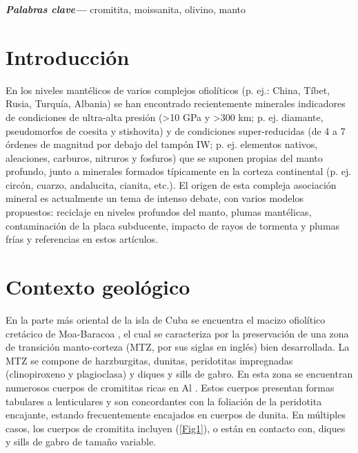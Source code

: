 \documentclass[a4paper,11pt]{article}
\providecommand{\keywords}[1]{\textbf{\textit{Palabras clave---}} #1}
\begin{document}
	\keywords{cromitita, moissanita, olivino, manto}
	 \\
	 \tableofcontents
	\begin{multicols}{2}
		\section{Introducción}
		En los niveles mantélicos de varios complejos ofiolíticos (p. ej.: China, Tíbet, Rusia, Turquía, Albania) se han encontrado recientemente minerales indicadores de condiciones de ultra-alta presión (\textgreater10 GPa y \textgreater300 km; p. ej. diamante, pseudomorfos de coesita y stishovita) y de condiciones super-reducidas (de 4 a 7 órdenes de magnitud por debajo del tampón IW; p. ej. elementos nativos, aleaciones, carburos, nitruros y fosfuros) que se suponen propias del manto profundo, junto a minerales formados típicamente en la corteza continental (p. ej. circón, cuarzo, andalucita, cianita, etc.). El origen de esta compleja asociación mineral es actualmente un tema de intenso debate, con varios modelos propuestos: reciclaje en niveles profundos del manto, plumas mantélicas, contaminación de la placa subducente, impacto de rayos de tormenta y plumas frías \cite{Pujol-Sola2018,Xiong} y referencias en estos artículos. 
		\section{Contexto geológico}
		En la parte más oriental de la isla de Cuba se encuentra el macizo ofiolítico cretácico de Moa-Baracoa \cite{Iturralde}, el cual se caracteriza por la preservación de una zona de transición manto-corteza (MTZ, por sus siglas en inglés) bien desarrollada. La MTZ se compone de harzburgitas, dunitas, peridotitas impregnadas (clinopiroxeno y plagioclasa) y diques y sills de gabro. En esta zona se encuentran numerosos cuerpos de cromititas ricas en Al \cite{Proenza1999}. Estos cuerpos presentan formas tabulares a lenticulares y son concordantes con la foliación de la peridotita encajante, estando frecuentemente encajados en cuerpos de dunita. En múltiples casos, los cuerpos de cromitita incluyen (\ref{Fig1}), o están en contacto con, diques y sills de gabro de tamaño variable.
	\end{multicols}
	
\end{document}
